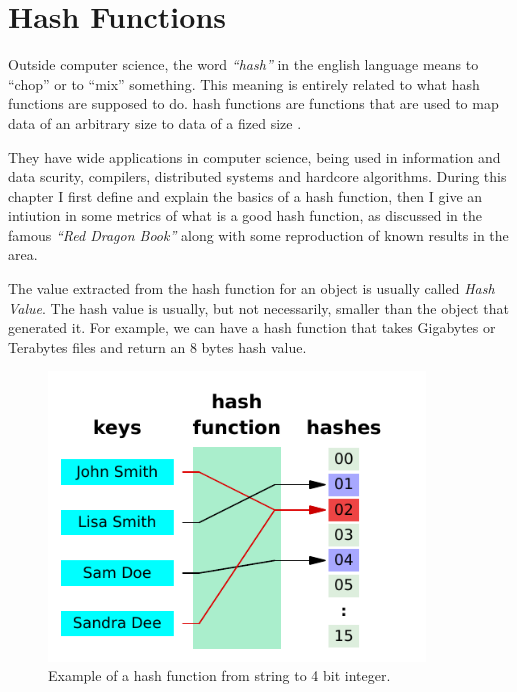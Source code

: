 \chapter{Hash Functions}
\label{cap:Hash Functions}


Outside computer science, the word \textit{``hash''} in the english language means to ``chop'' or to ``mix'' something. This meaning is entirely related to what hash functions are supposed to do. hash functions are functions that are used to map data of an arbitrary size to data of a fized size \cite{HashFuncWiki}.

They have wide applications in computer science, being used in information and data scurity, compilers, distributed systems and hardcore algorithms. During this chapter I first define and explain the basics of a hash function, then I give an intiution in some metrics of what is a good hash function, as discussed in the famous \textit{``Red Dragon Book''} \cite{DragonBook} along with some reproduction of known results in the area.

The value extracted from the hash function for an object is usually called \textit{Hash Value}. The hash value is usually, but not necessarily, smaller than the object that generated it. For example, we can have a hash function that takes Gigabytes or Terabytes files and return an 8 bytes hash value.

\begin{figure}[h!]
  \centering
  \includegraphics[width=10cm]{figuras/hash-function.pdf}
  \caption{Example of a hash function from string to 4 bit integer. }
\end{figure}

